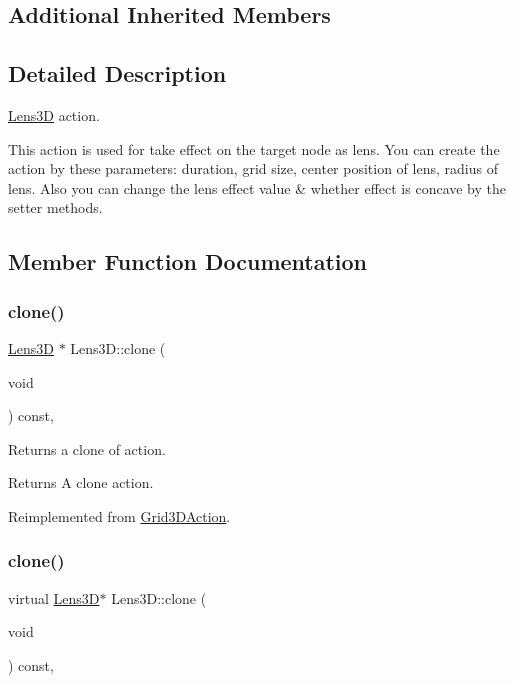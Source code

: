 \subsection*{Additional Inherited Members}


\subsection{Detailed Description}
\hyperlink{classLens3D}{Lens3D} action. 

This action is used for take effect on the target node as lens. You can create the action by these parameters\+: duration, grid size, center position of lens, radius of lens. Also you can change the lens effect value \& whether effect is concave by the setter methods. 

\subsection{Member Function Documentation}
\mbox{\label{classLens3D_a7b97fe4349267d8a3a7404e8bc19aa33}} 
\subsubsection{\texorpdfstring{clone()}{clone()}\hspace{0.1cm}{\footnotesize\ttfamily [1/2]}}
{\footnotesize\ttfamily \hyperlink{classLens3D}{Lens3D} $\ast$ Lens3\+D\+::clone (\begin{DoxyParamCaption}\item[{void}]{ }\end{DoxyParamCaption}) const\hspace{0.3cm}{\ttfamily [override]}, {\ttfamily [virtual]}}

Returns a clone of action.

\begin{DoxyReturn}{Returns}
A clone action. 
\end{DoxyReturn}


Reimplemented from \hyperlink{classGrid3DAction_a01d5b2d60654ef66d6551ac2190ed14c}{Grid3\+D\+Action}.

\mbox{\label{classLens3D_ad628edf64ecd2f4fe17a6ae7530cf2b7}} 
\subsubsection{\texorpdfstring{clone()}{clone()}\hspace{0.1cm}{\footnotesize\ttfamily [2/2]}}
{\footnotesize\ttfamily virtual \hyperlink{classLens3D}{Lens3D}$\ast$ Lens3\+D\+::clone (\begin{DoxyParamCaption}\item[{void}]{ }\end{DoxyParamCaption}) const\hspace{0.3cm}{\ttfamily [override]}, {\ttfamily [virtual]}}

